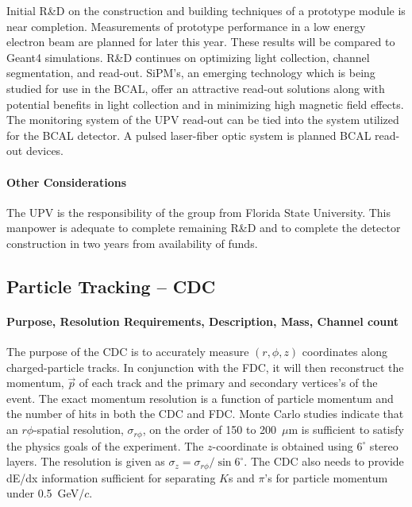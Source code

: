 \documentclass[11pt]{article}
\begin{document}
Initial R\&D on the construction and building techniques of a prototype module is 
near completion. Measurements of prototype performance in a low energy electron 
beam are planned for later this year.  These results will be compared to Geant4 
simulations.   R\&D continues on optimizing light collection, channel segmentation, 
and read-out. SiPM's, an emerging technology which is being studied for use in the BCAL, 
offer an attractive read-out solutions along with potential benefits in light collection 
and in minimizing high magnetic field effects. The monitoring system of the UPV read-out 
can be tied into the system utilized for the BCAL detector. A pulsed laser-fiber optic 
system is planned BCAL read-out devices.



\paragraph{Other Considerations}

The UPV is the responsibility of the group from Florida State University.  This manpower is 
adequate to complete remaining R\&D and to complete the detector construction 
in two years from availability of funds.

\subsection{Particle Tracking -- CDC}

\paragraph{Purpose, Resolution Requirements, Description, Mass, Channel count}

The purpose of the CDC is to accurately measure $(r,\phi,z)$
coordinates along charged-particle tracks. In conjunction with the FDC, it
will then  reconstruct the momentum, $\vec{p}$ of each track and the primary and
secondary vertices's of the event. The exact momentum resolution is a function 
of particle momentum and the number of hits in both the CDC and FDC. Monte Carlo
studies indicate that an $r\phi$-spatial resolution, $\sigma_{r\phi}$, on the 
order of 150 to 200~$\mu$m is sufficient to satisfy the physics goals of the 
experiment. The $z$-coordinate is obtained using $6^{\circ}$ stereo layers. 
The resolution is given as $\sigma_{z}=\sigma_{r\phi}/\sin 6^{\circ}$.  
The CDC also needs to provide dE/dx information sufficient for separating 
$K$s and $\pi$'s for particle momentum under 0.5~GeV/$c$.
\end{document}
